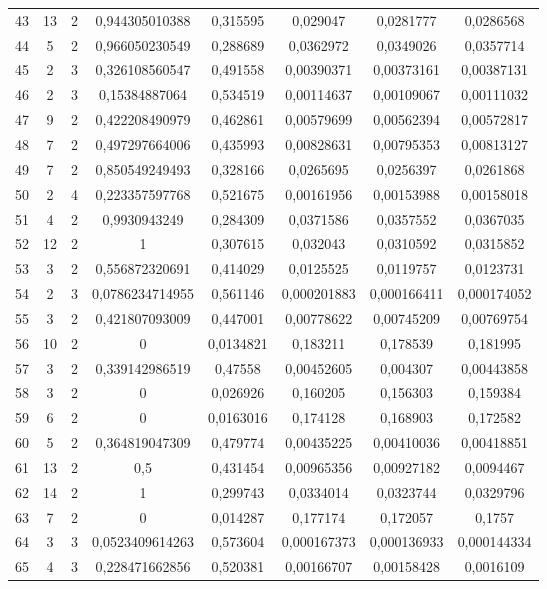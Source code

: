 \begin{longtable}{|c|c|c|c|c|c|c|c|}
43 & 13 & 2 & 0,944305010388 & 0,315595 & 0,029047 & 0,0281777 & 0,0286568  \\
44 & 5 & 2 & 0,966050230549 & 0,288689 & 0,0362972 & 0,0349026 & 0,0357714  \\
45 & 2 & 3 & 0,326108560547 & 0,491558 & 0,00390371 & 0,00373161 & 0,00387131  \\
46 & 2 & 3 & 0,15384887064 & 0,534519 & 0,00114637 & 0,00109067 & 0,00111032  \\
47 & 9 & 2 & 0,422208490979 & 0,462861 & 0,00579699 & 0,00562394 & 0,00572817  \\
48 & 7 & 2 & 0,497297664006 & 0,435993 & 0,00828631 & 0,00795353 & 0,00813127  \\
49 & 7 & 2 & 0,850549249493 & 0,328166 & 0,0265695 & 0,0256397 & 0,0261868  \\
50 & 2 & 4 & 0,223357597768 & 0,521675 & 0,00161956 & 0,00153988 & 0,00158018  \\
51 & 4 & 2 & 0,9930943249 & 0,284309 & 0,0371586 & 0,0357552 & 0,0367035  \\
52 & 12 & 2 & 1 & 0,307615 & 0,032043 & 0,0310592 & 0,0315852  \\
53 & 3 & 2 & 0,556872320691 & 0,414029 & 0,0125525 & 0,0119757 & 0,0123731  \\
54 & 2 & 3 & 0,0786234714955 & 0,561146 & 0,000201883 & 0,000166411 & 0,000174052  \\
55 & 3 & 2 & 0,421807093009 & 0,447001 & 0,00778622 & 0,00745209 & 0,00769754  \\
56 & 10 & 2 & 0 & 0,0134821 & 0,183211 & 0,178539 & 0,181995  \\
57 & 3 & 2 & 0,339142986519 & 0,47558 & 0,00452605 & 0,004307 & 0,00443858  \\
58 & 3 & 2 & 0 & 0,026926 & 0,160205 & 0,156303 & 0,159384  \\
59 & 6 & 2 & 0 & 0,0163016 & 0,174128 & 0,168903 & 0,172582  \\
60 & 5 & 2 & 0,364819047309 & 0,479774 & 0,00435225 & 0,00410036 & 0,00418851  \\
61 & 13 & 2 & 0,5 & 0,431454 & 0,00965356 & 0,00927182 & 0,0094467  \\
62 & 14 & 2 & 1 & 0,299743 & 0,0334014 & 0,0323744 & 0,0329796  \\
63 & 7 & 2 & 0 & 0,014287 & 0,177174 & 0,172057 & 0,1757  \\
64 & 3 & 3 & 0,0523409614263 & 0,573604 & 0,000167373 & 0,000136933 & 0,000144334  \\
65 & 4 & 3 & 0,228471662856 & 0,520381 & 0,00166707 & 0,00158428 & 0,0016109  \\

\end{longtable}
